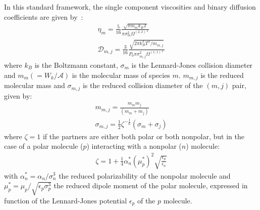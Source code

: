 In this standard framework, the single component viscosities and binary diffusion coefficients are given by~\cite{Hirschfelder:1954}:
\begin{eqnarray}
\eta_m = \frac{5}{16} \frac{\sqrt{\pi m_m k_B T}}{\pi \sigma^2_m \Omega^{(2,2)*}}
\label{muCoefs}
\\
 \mathcal{D}_{m,j} = \frac{3}{16}\frac{\sqrt{2 \pi k^3_B T^3/m_{m,j}}}{P_0 \pi \sigma^2_{m,j} \Omega^{(1,1)*}}
 \label{difCoefs}
\end{eqnarray}
where $k_B$ is the Boltzmann constant, $\sigma_m$ is the Lennard-Jones collision diameter and $m_m (= W_k/\mathcal{A})$ is the molecular mass of species $m$. $m_{m,j}$ is the reduced molecular mass and $\sigma_{m,j}$ is the reduced collision diameter of the $(m,j)$ pair, given by:
\begin{eqnarray}
m_{m,j} = \frac{m_m m_j }{ (m_m + m_j)}
\\
\sigma_{m,j} = \frac{1}{2} \zeta^{-\frac{1}{6}}(\sigma_m + \sigma_j)
\label{redCollision}
\end{eqnarray}
where $\zeta=1$ if the partners are either both polar or both nonpolar, but in the case of a polar molecule ($p$) interacting with a nonpolar ($n$) molecule:
\begin{eqnarray}
\zeta=1 + \frac{1}{4} \alpha^*_n (\mu^*_p)^2 \sqrt{\frac{\epsilon_p}{\epsilon_n}}
\end{eqnarray}
with $ \alpha^*_n = \alpha_n / \sigma^3_n$ the reduced polarizability of the nonpolar molecule and  $\mu^*_p = \mu_p/\sqrt{\epsilon_p \sigma^3_p}$ the reduced dipole moment of the polar molecule, expressed in function of the Lennard-Jones potential $\epsilon_p$ of the $p$ molecule.

